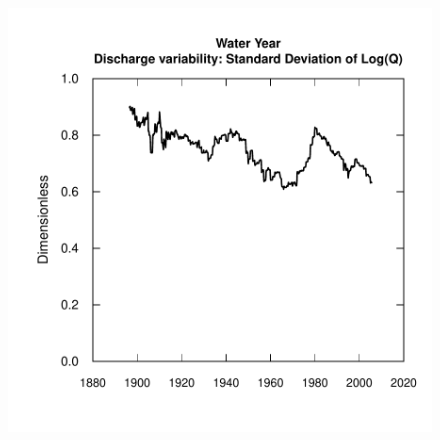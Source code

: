 \documentclass[a4paper,11pt]{article}
\begin{document}
\begin{figure}[htbp]
  \begin{minipage}[h]{0.5\linewidth}
    \begin{center}


\includegraphics{EGRET-fig2a}
    \label{fig:SD1}
    \end{center}
  \end{minipage}
  \hspace{0.5cm}
  \begin{minipage}[h]{0.5\linewidth}
    \begin{center}



\end{center}
\end{minipage}
\end{figure}
\end{document}
